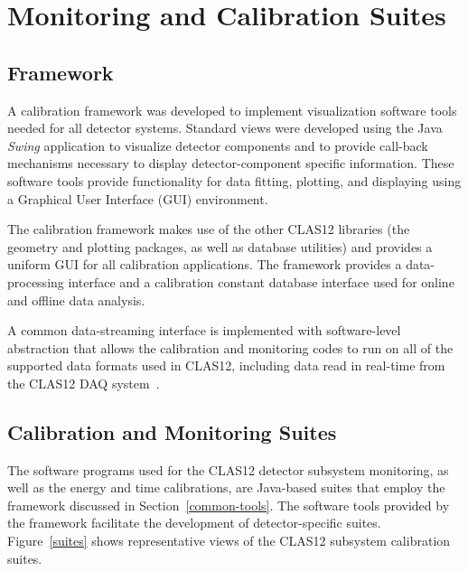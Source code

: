 \section{Monitoring and Calibration Suites}
\label{sec:calibration}

\subsection{Framework}

A calibration framework was developed to implement visualization software tools needed for all detector
systems. Standard views were developed using the Java {\it Swing} application to visualize detector components
and to provide call-back mechanisms necessary to display detector-component specific information.  These
software tools provide functionality for data fitting, plotting, and displaying using a Graphical User Interface
(GUI) environment.

The calibration framework makes use of the other CLAS12 libraries (the geometry and plotting packages, as well
as database utilities) and provides a uniform GUI for all calibration applications. The framework provides a
data-processing interface and a calibration constant database interface used for online and offline data analysis.

A common data-streaming interface is implemented with software-level abstraction that allows the calibration and
monitoring codes to run on all of the supported data formats used in CLAS12, including data read in real-time from
the CLAS12 DAQ system~\cite{daq-nim}.

\subsection{Calibration and Monitoring Suites}

The software programs used for the CLAS12 detector subsystem monitoring, as well as the energy and time
calibrations,  are Java-based suites that employ the framework discussed in Section~\ref{common-tools}. The
software tools provided by the framework facilitate the development of detector-specific suites.
Figure~\ref{suites} shows representative views of the CLAS12 subsystem calibration suites.

